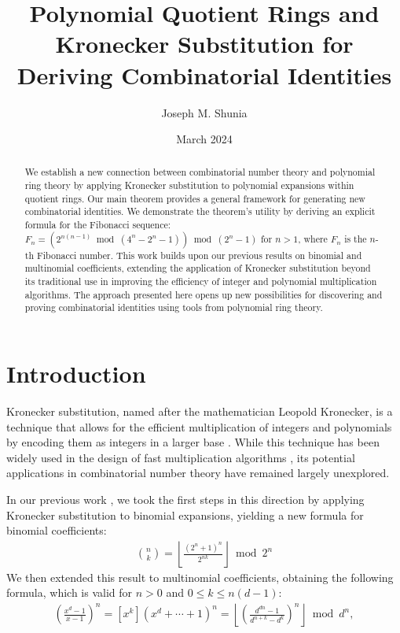 \documentclass[12pt,reqno]{article}
\theoremstyle{plain}
\theoremstyle{definition}
\begin{document}
\title{Polynomial Quotient Rings and Kronecker Substitution for Deriving Combinatorial Identities}
\author{Joseph M. Shunia}
\date{March 2024}

\maketitle

\begin{abstract}
We establish a new connection between combinatorial number theory and polynomial ring theory by applying Kronecker substitution to polynomial expansions within quotient rings. Our main theorem provides a general framework for generating new combinatorial identities. We demonstrate the theorem's utility by deriving an explicit formula for the Fibonacci sequence: $F_n = (2^{n (n - 1)} \bmod{(4^n-2^n-1)}) \bmod{(2^n-1)}$ for $n > 1$, where $F_n$ is the $n$-th Fibonacci number. This work builds upon our previous results on binomial and multinomial coefficients, extending the application of Kronecker substitution beyond its traditional use in improving the efficiency of integer and polynomial multiplication algorithms. The approach presented here opens up new possibilities for discovering and proving combinatorial identities using tools from polynomial ring theory.
\end{abstract}

\section{Introduction}
Kronecker substitution, named after the mathematician Leopold Kronecker, is a technique that allows for the efficient multiplication of integers and polynomials by encoding them as integers in a larger base \cite{kronecker1882}. While this technique has been widely used in the design of fast multiplication algorithms \cite{harvey2009kronecker, harvey2014faster}, its potential applications in combinatorial number theory have remained largely unexplored.

In our previous work \cite{shunia2023simple}, we took the first steps in this direction by applying Kronecker substitution to binomial expansions, yielding a new formula for binomial coefficients:
\begin{align*}
    \binom{n}{k} = \left\lfloor \frac{(2^n+1)^n}{2^{n k}} \right\rfloor \bmod{2^n}
\end{align*}
We then extended this result to multinomial coefficients, obtaining the following formula, which is valid for $n > 0$ and $0 \leq k \leq n (d-1)$:
\begin{align*}
    [x^k] \left(\frac{x^{d}-1}{x-1}\right)^n = [x^k] (x^d+\cdots+1)^n = \left\lfloor \left(\frac{d^{d n} - 1}{d^{n+k} - d^k}\right)^n\right\rfloor \bmod d^n, 
\end{align*}
\end{document}
